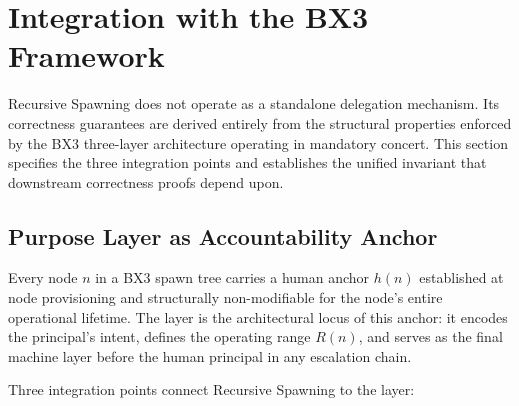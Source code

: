 \section{Integration with the BX3 Framework}
\label{sec:rs-integration}

Recursive Spawning does not operate as a standalone delegation mechanism.
Its correctness guarantees are derived entirely from the structural properties
enforced by the BX3 three-layer architecture operating in mandatory concert.
This section specifies the three integration points and establishes the
unified invariant that downstream correctness proofs depend upon.

\subsection{Purpose Layer as Accountability Anchor}
\label{sec:rs-purpose-anchor}

Every node $n$ in a BX3 spawn tree carries a human anchor $h(n)$ established
at node provisioning and structurally non-modifiable for the node's entire
operational lifetime.  The \Purpose{} layer is the architectural locus of this
anchor: it encodes the principal's intent, defines the operating range $R(n)$,
and serves as the final machine layer before the human principal in any
escalation chain.

Three integration points connect Recursive Spawning to the \Purpose{} layer:

